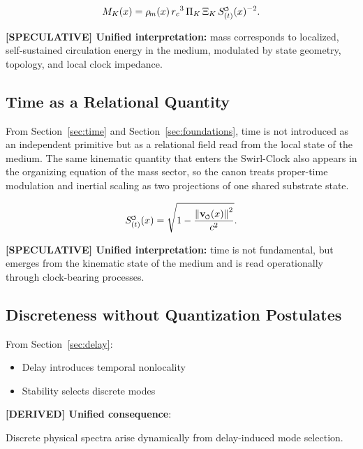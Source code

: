 \documentclass[11pt]{article}
\theoremstyle{definition}
\theoremstyle{plain}
\theoremstyle{remark}
\newcommand{\swirlarrow}{\mathchoice{\mkern-2mu\scriptstyle\boldsymbol{\circlearrowleft}}{\mkern-2mu\scriptstyle\boldsymbol{\circlearrowleft}}{\mkern-2mu\scriptscriptstyle\boldsymbol{\circlearrowleft}}{\mkern-2mu\scriptscriptstyle\boldsymbol{\circlearrowleft}}}
\newcommand{\vswirl}{\mathbf{v}_{\swirlarrow}}
\newcommand{\rhoM}{\rho_{\!m}}
\newcommand{\SwirlClock}{{S_{(t)}^{\swirlarrow}}}
\newcommand{\rc}{{r_c}}
\begin{document}
        \begin{align}
            M_K(x)=\rhoM(x)\,\rc^3\,\Pi_K\,\Xi_K\,\SwirlClock(x)^{-2}.
        \end{align}
        
        \textbf{[SPECULATIVE] Unified interpretation:} mass corresponds to localized, self-sustained circulation energy in the medium, modulated by state geometry, topology, and local clock impedance.
    
    \subsection{Time as a Relational Quantity}
        
        From Section~\ref{sec:time} and Section~\ref{sec:foundations}, time is not introduced as an independent primitive but as a relational field read from the local state of the medium. The same kinematic quantity that enters the Swirl-Clock also appears in the organizing equation of the mass sector, so the canon treats proper-time modulation and inertial scaling as two projections of one shared substrate state.
        
        \begin{align}
            \SwirlClock(x)=\sqrt{1-\frac{\norm{\vswirl(x)}^2}{c^2}}.
        \end{align}
        
        \textbf{[SPECULATIVE] Unified interpretation:} time is not fundamental, but emerges from the kinematic state of the medium and is read operationally through clock-bearing processes.
    
    \subsection{Discreteness without Quantization Postulates}
        
        From Section~\ref{sec:delay}:
        
        \begin{itemize}
            \item Delay introduces temporal nonlocality
            \item Stability selects discrete modes
        \end{itemize}
        
        \textbf{[DERIVED] Unified consequence}:
        \begin{center}
            Discrete physical spectra arise dynamically from delay-induced mode selection.
        \end{center}
        
\end{document}
